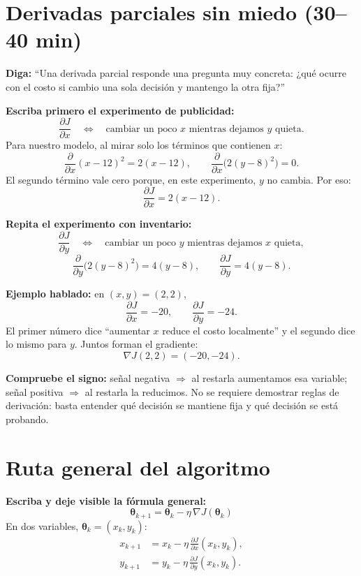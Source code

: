 \documentclass[11pt]{article}
\begin{document}
\section*{Derivadas parciales sin miedo (30--40 min)}
\textbf{Diga:} ``Una derivada parcial responde una pregunta muy concreta:
¿qué ocurre con el costo si cambio una sola decisión y mantengo la otra fija?''

\textbf{Escriba primero el experimento de publicidad:}
\[
\frac{\partial J}{\partial x}
\quad\Longleftrightarrow\quad
\text{cambiar un poco }x\text{ mientras dejamos }y\text{ quieta}.
\]
Para nuestro modelo, al mirar solo los términos que contienen $x$:
\[
\frac{\partial}{\partial x}(x-12)^2=2(x-12),
\qquad
\frac{\partial}{\partial x}\bigl(2(y-8)^2\bigr)=0.
\]
El segundo término vale cero porque, en este experimento, $y$ no cambia.
Por eso:
\[
\boxed{\frac{\partial J}{\partial x}=2(x-12)}.
\]

\textbf{Repita el experimento con inventario:}
\[
\frac{\partial J}{\partial y}
\quad\Longleftrightarrow\quad
\text{cambiar un poco }y\text{ mientras dejamos }x\text{ quieta},
\]
\[
\frac{\partial}{\partial y}\bigl(2(y-8)^2\bigr)=4(y-8),
\qquad
\boxed{\frac{\partial J}{\partial y}=4(y-8)}.
\]

\textbf{Ejemplo hablado:} en $(x,y)=(2,2)$,
\[
\frac{\partial J}{\partial x}=-20,\qquad
\frac{\partial J}{\partial y}=-24.
\]
El primer número dice ``aumentar $x$ reduce el costo localmente'' y el segundo
 dice lo mismo para $y$. Juntos forman el gradiente:
\[
\boxed{\nabla J(2,2)=(-20,-24)}.
\]

\textbf{Compruebe el signo:} señal negativa $\Rightarrow$ al restarla aumentamos esa
variable; señal positiva $\Rightarrow$ al restarla la reducimos. No se requiere
demostrar reglas de derivación: basta entender qué decisión se mantiene fija y qué
decisión se está probando.

\section*{Ruta general del algoritmo}
\textbf{Escriba y deje visible la fórmula general:}
\[
\boxed{\boldsymbol{\theta}_{k+1}
=\boldsymbol{\theta}_k-\eta\,\nabla J(\boldsymbol{\theta}_k)}
\]
En dos variables, $\boldsymbol{\theta}_k=(x_k,y_k)$:
\[
\boxed{
\begin{aligned}
x_{k+1}&=x_k-\eta\,\frac{\partial J}{\partial x}(x_k,y_k),\\
y_{k+1}&=y_k-\eta\,\frac{\partial J}{\partial y}(x_k,y_k).
\end{aligned}}
\]
\end{document}
